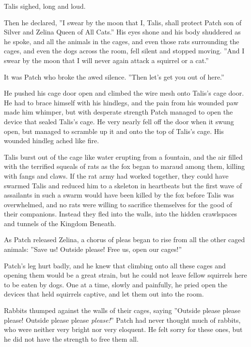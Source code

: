 \documentclass[12pt]{book}
\begin{document}
 Talis sighed, long and loud.\par
Then he declared, ''I swear by the moon that I, Talis, shall protect Patch son of Silver and Zelina Queen of All Cats.'' His eyes shone and his body shuddered as he spoke, and all the animals in the cages, and even those rats surrounding the cages, and even the dogs across the room, fell silent and stopped moving. ''And I swear by the moon that I will never again attack a squirrel or a cat.''\par
 It was Patch who broke the awed silence. ''Then let's get you out of here.''\par
 He pushed his cage door open and climbed the wire mesh onto Talis's cage door. He had to brace himself with his hindlegs, and the pain from his wounded paw made him whimper, but with desperate strength Patch managed to open the device that sealed Talis's cage. He very nearly fell off the door when it swung open, but managed to scramble up it and onto the top of Talis's cage. His wounded hindleg ached like fire.\par
 Talis burst out of the cage like water erupting from a fountain, and the air filled with the terrified squeals of rats as the fox began to maraud among them, killing with fangs and claws. If the rat army had worked together, they could have swarmed Talis and reduced him to a skeleton in heartbeats %
 but the first wave of assailants in such a swarm would have been killed by the fox before Talis was overwhelmed, and no rats were willing to sacrifice themselves for the good of their companions. Instead they fled into the walls, into the hidden crawlspaces and tunnels of the Kingdom Beneath.\par
 As Patch released Zelina, a chorus of pleas began to rise from all the other caged animals: ''Save us! Outside please! Free us, open our cages!''\par
 Patch's leg hurt badly, and he knew that climbing onto all these cages and opening them would be a great strain, but he could not leave fellow squirrels here to be eaten by dogs. One at a time, slowly and painfully, he pried open the devices that held squirrels captive, and let them out into the room.\par
Rabbits thumped against the walls of their cages, saying ''Outside please please please! Outside please please {\it please!}'' Patch had never thought much of rabbits, who were neither very bright nor very eloquent. He felt sorry for these ones, but he did not have the strength to free them all.\par
\end{document}

